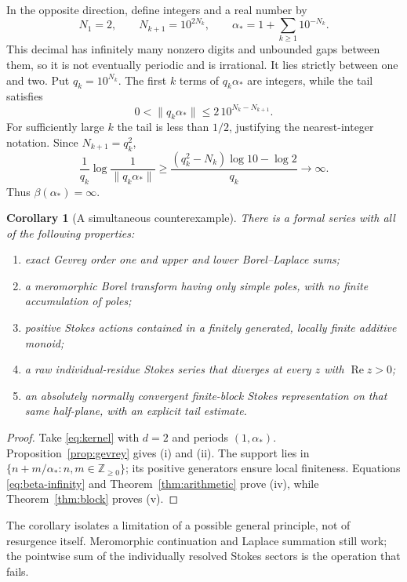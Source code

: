 \documentclass[11pt,a4paper]{article}
\numberwithin{equation}{section}
\newtheorem{corollary}[theorem]{Corollary}
\theoremstyle{definition}
\theoremstyle{remark}
\newcommand{\re}{\operatorname{Re}}
\newcommand{\Z}{\mathbb Z}
\begin{document}
In the opposite direction, define integers and a real number by
\begin{equation}
 N_1=2,\qquad N_{k+1}=10^{2N_k},\qquad
 \alpha_*=1+\sum_{k\ge1}10^{-N_k}.
 \label{eq:superliouville}
\end{equation}
This decimal has infinitely many nonzero digits and unbounded gaps
between them, so it is not eventually periodic and is irrational. It
lies strictly between one and two. Put $q_k=10^{N_k}$. The first $k$
terms of $q_k\alpha_*$ are integers, while the tail satisfies
\[
 0<\|q_k\alpha_*\|\le
   2\,10^{N_k-N_{k+1}}.
\]
For sufficiently large $k$ the tail is less than $1/2$, justifying the
nearest-integer notation. Since $N_{k+1}=q_k^2$,
\begin{equation}
 \frac1{q_k}\log\frac1{\|q_k\alpha_*\|}
 \ge\frac{(q_k^2-N_k)\log10-\log2}{q_k}
 \longrightarrow\infty.
 \label{eq:beta-infinity}
\end{equation}
Thus $\beta(\alpha_*)=\infty$.

\begin{corollary}[A simultaneous counterexample]
\label{cor:counterexample}
There is a formal series with all of the following properties:
\begin{enumerate}[label=(\roman*)]
\item exact Gevrey order one and upper and lower Borel--Laplace sums;
\item a meromorphic Borel transform having only simple poles, with no finite
accumulation of poles;
\item positive Stokes actions contained in a finitely generated, locally
finite additive monoid;
\item a raw individual-residue Stokes series that diverges at every
$z$ with $\re z>0$;
\item an absolutely normally convergent finite-block Stokes representation
on that same half-plane, with an explicit tail estimate.
\end{enumerate}
\end{corollary}
\begin{proof}
Take \eqref{eq:kernel} with $d=2$ and periods $(1,\alpha_*)$.
Proposition~\ref{prop:gevrey} gives (i) and (ii). The support lies in
$\{n+m/\alpha_*:n,m\in\Z_{\ge0}\}$; its positive generators ensure local
finiteness. Equations \eqref{eq:beta-infinity} and
Theorem~\ref{thm:arithmetic} prove (iv), while
Theorem~\ref{thm:block} proves (v).
\end{proof}
The corollary isolates a limitation of a possible general principle,
not of resurgence itself. Meromorphic continuation and Laplace
summation still work; the pointwise sum of the individually resolved
Stokes sectors is the operation that fails.
\end{document}
